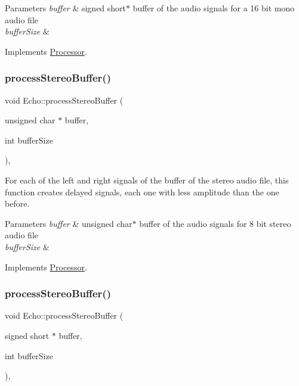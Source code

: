 \begin{DoxyParams}{Parameters}
{\em buffer} & signed short$\ast$ buffer of the audio signals for a 16 bit mono audio file \\
\hline
{\em buffer\+Size} & \\
\hline
\end{DoxyParams}


Implements \hyperlink{classProcessor}{Processor}.

\mbox{\label{classEcho_ab2dcc623d727179be1dcb8ac34a8453b}} 
\subsubsection{\texorpdfstring{process\+Stereo\+Buffer()}{processStereoBuffer()}\hspace{0.1cm}{\footnotesize\ttfamily [1/2]}}
{\footnotesize\ttfamily void Echo\+::process\+Stereo\+Buffer (\begin{DoxyParamCaption}\item[{unsigned char $\ast$}]{buffer,  }\item[{int}]{buffer\+Size }\end{DoxyParamCaption})\hspace{0.3cm}{\ttfamily [override]}, {\ttfamily [virtual]}}



For each of the left and right signals of the buffer of the stereo audio file, this function creates delayed signals, each one with less amplitude than the one before. 


\begin{DoxyParams}{Parameters}
{\em buffer} & unsigned char$\ast$ buffer of the audio signals for 8 bit stereo audio file \\
\hline
{\em buffer\+Size} & \\
\hline
\end{DoxyParams}


Implements \hyperlink{classProcessor}{Processor}.

\mbox{\label{classEcho_a20e6822ef9fc01f0afec9cb8b890a70c}} 
\subsubsection{\texorpdfstring{process\+Stereo\+Buffer()}{processStereoBuffer()}\hspace{0.1cm}{\footnotesize\ttfamily [2/2]}}
{\footnotesize\ttfamily void Echo\+::process\+Stereo\+Buffer (\begin{DoxyParamCaption}\item[{signed short $\ast$}]{buffer,  }\item[{int}]{buffer\+Size }\end{DoxyParamCaption})\hspace{0.3cm}{\ttfamily [override]}, {\ttfamily [virtual]}}



